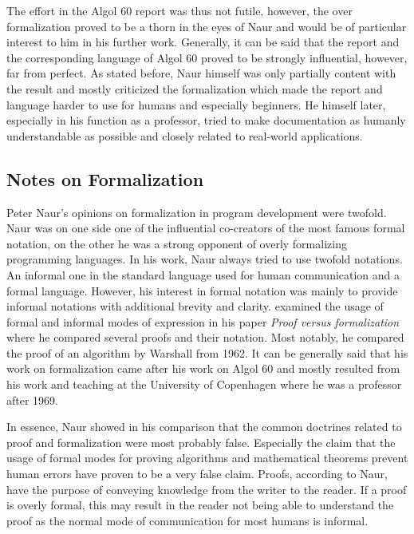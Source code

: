 \documentclass{article}
\begin{document}
The effort in the Algol 60 report was thus not futile, however, the over formalization proved to be a thorn in the eyes of Naur and would be of particular interest to him in his further work. Generally, it can be said that the report and the corresponding language of Algol 60 proved to be strongly influential, however, far from perfect. As stated before, Naur himself was only partially content with the result and mostly criticized the formalization which made the report and language harder to use for humans and especially beginners. He himself later, especially in his function as a professor, tried to make documentation as humanly understandable as possible and closely related to real-world applications. 

\subsection{Notes on Formalization}
Peter Naur's opinions on formalization in program development were twofold. Naur was on one side one of the influential co-creators of the most famous formal notation, on the other he was a strong opponent of overly formalizing programming languages. In his work, Naur always tried to use twofold notations. An informal one in the standard language used for human communication and a formal language. However, his interest in formal notation was mainly to provide informal notations with additional brevity and clarity. \cite{naur1994proof} examined the usage of formal and informal modes of expression in his paper \textit{Proof versus formalization} where he compared several proofs and their notation. Most notably, he compared the proof of an algorithm by Warshall from 1962. It can be generally said that his work on formalization came after his work on Algol 60 and mostly resulted from his work and teaching at the University of Copenhagen where he was a professor after 1969.

In essence, Naur showed in his comparison that the common doctrines related to proof and formalization were most probably false. Especially the claim that the usage of formal modes for proving algorithms and mathematical theorems prevent human errors have proven to be a very false claim. Proofs, according to Naur, have the purpose of conveying knowledge from the writer to the reader. If a proof is overly formal, this may result in the reader not being able to understand the proof as the normal mode of communication for most humans is informal.
\end{document}
